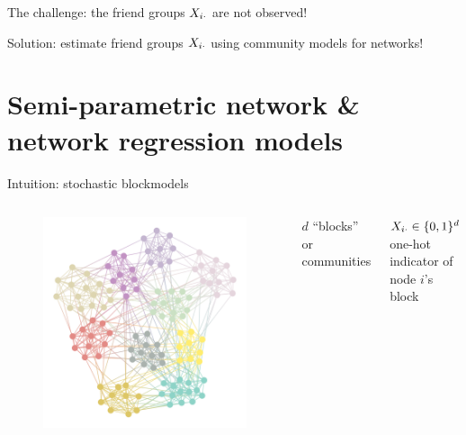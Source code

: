 \documentclass{beamer}
\theoremstyle{remark}
\begin{document}
\begin{frame}{The challenge: the friend groups $X_{i \cdot}$ are not observed!}

    Solution: estimate friend groups $X_{i \cdot}$ using community models for networks!

\end{frame}



\section{Semi-parametric network \& network regression models}

\begin{frame}{Intuition: stochastic blockmodels}

    \begin{columns}

        \begin{figure}
            \includegraphics[width=\textwidth]{figures/assortative.png}
        \end{figure}


        $d$ ``blocks'' or communities

        $X_{i \cdot} \in \{0, 1\}^d$ one-hot indicator of node $i$'s block


\end{columns}
\end{frame}
\end{document}
